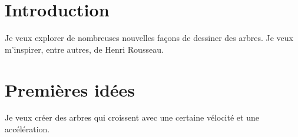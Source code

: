 
\section{Introduction}
Je veux explorer de nombreuses nouvelles façons de dessiner des arbres. Je veux m'inspirer, entre autres, de Henri Rousseau.
\section{Premières idées}
Je veux créer des arbres qui croissent avec une certaine vélocité et une accélération.
